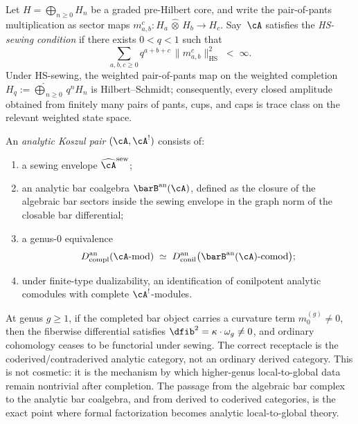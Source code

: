\begin{definition}
\label{def:hs-sewing-condition}
Let $H = \bigoplus_{n \geq 0} H_n$ be a graded pre-Hilbert core,
and write the pair-of-pants multiplication as sector maps
$m^c_{a,b} \colon H_a \,\widehat{\otimes}\, H_b \to H_c$.
Say~$\cA$ satisfies the \emph{HS-sewing condition} if there exists
$0 < q < 1$ such that
\begin{equation}\label{eq:hs-sewing-condition}
\sum_{a,b,c \geq 0}
q^{a+b+c}\, \|m^c_{a,b}\|_{\mathrm{HS}}^2
\;<\; \infty.
\end{equation}
Under HS-sewing, the weighted pair-of-pants map on the weighted
completion $H_q := \widehat{\bigoplus}_{n \geq 0}\, q^n H_n$ is
Hilbert--Schmidt; consequently, every closed amplitude obtained from
finitely many pairs of pants, cups, and caps is trace class on the
relevant weighted state space.
\end{definition}

\begin{definition}
\label{def:analytic-koszul-pair-frontier}
An \emph{analytic Koszul pair} $(\cA, \cA^!)$ consists of:
\begin{enumerate}[label=\textup{(\roman*)}]
\item a sewing envelope $\widehat{\cA}^{\mathrm{sew}}$;
\item an analytic bar coalgebra $\barB^{\mathrm{an}}(\cA)$, defined
 as the closure of the algebraic bar sectors inside the sewing
 envelope in the graph norm of the closable bar differential;
\item a genus-$0$ equivalence
 \[
 D^{\mathrm{an}}_{\mathrm{compl}}(\cA\text{-}\mathrm{mod})
 \;\simeq\;
 D^{\mathrm{an}}_{\mathrm{conil}}
 \bigl(\barB^{\mathrm{an}}(\cA)\text{-}\mathrm{comod}\bigr);
 \]
\item under finite-type dualizability, an identification of
 conilpotent analytic comodules with complete
 $\cA^!$-modules.
\end{enumerate}
\end{definition}

\begin{remark}
\label{rem:curvature-coderived-passage}
At genus $g \geq 1$, if the completed bar object carries a curvature
term $m_0^{(g)} \neq 0$, then the fiberwise differential satisfies
$\dfib^2 = \kappa \cdot \omega_g \neq 0$, and ordinary cohomology
ceases to be functorial under sewing. The correct receptacle is the
coderived/contraderived analytic category, not an ordinary derived
category. This is not cosmetic: it is the mechanism by which
higher-genus local-to-global data remain nontrivial after completion.
The passage from the algebraic bar complex to the analytic bar
coalgebra, and from derived to coderived categories, is the exact
point where formal factorization becomes analytic local-to-global
theory.
\end{remark}

